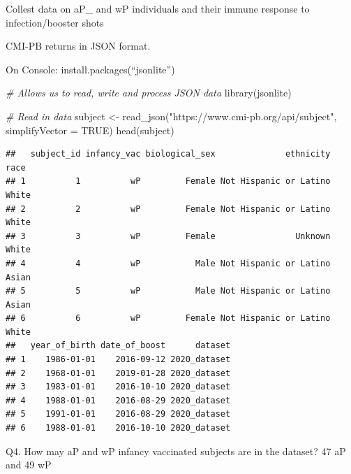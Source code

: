 \documentclass[
]{article}
\newenvironment{Shaded}{\begin{snugshade}}{\end{snugshade}}
\newcommand{\AttributeTok}[1]{\textcolor[rgb]{0.77,0.63,0.00}{#1}}
\newcommand{\CommentTok}[1]{\textcolor[rgb]{0.56,0.35,0.01}{\textit{#1}}}
\newcommand{\ConstantTok}[1]{\textcolor[rgb]{0.00,0.00,0.00}{#1}}
\newcommand{\FunctionTok}[1]{\textcolor[rgb]{0.00,0.00,0.00}{#1}}
\newcommand{\NormalTok}[1]{#1}
\newcommand{\OtherTok}[1]{\textcolor[rgb]{0.56,0.35,0.01}{#1}}
\newcommand{\SpecialCharTok}[1]{\textcolor[rgb]{0.00,0.00,0.00}{#1}}
\newcommand{\StringTok}[1]{\textcolor[rgb]{0.31,0.60,0.02}{#1}}
\begin{document}
Collest data on aP\_ and wP individuals and their immune response to
infection/booster shots

CMI-PB returns in JSON format.

On Console: install.packages(``jsonlite'')

\begin{Shaded}
\begin{Highlighting}[]
\CommentTok{\# Allows us to read, write and process JSON data}
\FunctionTok{library}\NormalTok{(jsonlite)}
\end{Highlighting}
\end{Shaded}

\begin{Shaded}
\begin{Highlighting}[]
\CommentTok{\# Read in data}
\NormalTok{subject }\OtherTok{\textless{}{-}} \FunctionTok{read\_json}\NormalTok{(}\StringTok{"https://www.cmi{-}pb.org/api/subject"}\NormalTok{, }\AttributeTok{simplifyVector =} \ConstantTok{TRUE}\NormalTok{) }
\FunctionTok{head}\NormalTok{(subject)}
\end{Highlighting}
\end{Shaded}

\begin{verbatim}
##   subject_id infancy_vac biological_sex              ethnicity  race
## 1          1          wP         Female Not Hispanic or Latino White
## 2          2          wP         Female Not Hispanic or Latino White
## 3          3          wP         Female                Unknown White
## 4          4          wP           Male Not Hispanic or Latino Asian
## 5          5          wP           Male Not Hispanic or Latino Asian
## 6          6          wP         Female Not Hispanic or Latino White
##   year_of_birth date_of_boost      dataset
## 1    1986-01-01    2016-09-12 2020_dataset
## 2    1968-01-01    2019-01-28 2020_dataset
## 3    1983-01-01    2016-10-10 2020_dataset
## 4    1988-01-01    2016-08-29 2020_dataset
## 5    1991-01-01    2016-08-29 2020_dataset
## 6    1988-01-01    2016-10-10 2020_dataset
\end{verbatim}

Q4. How may aP and wP infancy vaccinated subjects are in the dataset? 47
aP and 49 wP

\begin{Shaded}
\end{Shaded}
\end{document}
